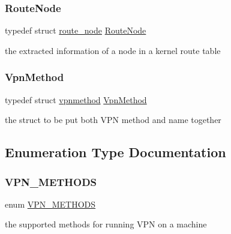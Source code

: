 \subsubsection{\texorpdfstring{Route\+Node}{RouteNode}}
{\footnotesize\ttfamily typedef struct \hyperlink{structroute__node}{route\+\_\+node} \hyperlink{route-tree_8h_a1296be44c6672a1adb94ba6dc416682c}{Route\+Node}}



the extracted information of a node in a kernel route table 

\mbox{\label{route-tree_8h_a1034dd038389279bf422489d4d99d43a}} 
\subsubsection{\texorpdfstring{Vpn\+Method}{VpnMethod}}
{\footnotesize\ttfamily typedef struct \hyperlink{structvpnmethod}{vpnmethod}  \hyperlink{route-tree_8h_a1034dd038389279bf422489d4d99d43a}{Vpn\+Method}}



the struct to be put both V\+PN method and name together 



\subsection{Enumeration Type Documentation}
\mbox{\label{route-tree_8h_a5b876670828c4e38106ba1c6d91024b7}} 
\subsubsection{\texorpdfstring{V\+P\+N\+\_\+\+M\+E\+T\+H\+O\+DS}{VPN\_METHODS}}
{\footnotesize\ttfamily enum \hyperlink{route-tree_8h_a5b876670828c4e38106ba1c6d91024b7}{V\+P\+N\+\_\+\+M\+E\+T\+H\+O\+DS}}



the supported methods for running V\+PN on a machine 

